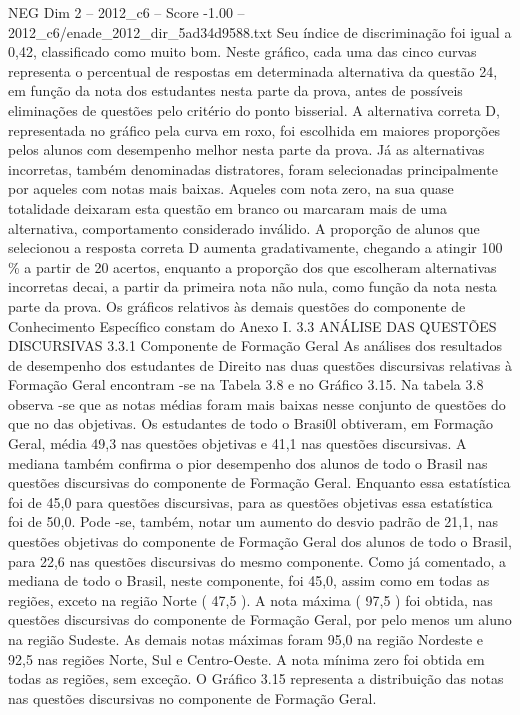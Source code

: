 \begin{textsample}{NEG Dim 2 – 2012\_c6 – Score -1.00 – 2012\_c6/enade\_2012\_dir\_5ad34d9588.txt}
Seu índice de discriminação foi igual a 0,42, classificado como muito bom.
Neste gráfico, cada uma das cinco curvas representa o percentual de respostas em determinada alternativa da questão 24, em função da nota dos estudantes nesta parte da prova, antes de possíveis eliminações de questões pelo critério do ponto bisserial.
A alternativa correta D, representada no gráfico pela curva em roxo, foi escolhida em maiores proporções pelos alunos com desempenho melhor nesta parte da prova.
Já as alternativas incorretas, também denominadas distratores, foram selecionadas principalmente por aqueles com notas mais baixas.
Aqueles com nota zero, na sua quase totalidade deixaram esta questão em branco ou marcaram mais de uma alternativa, comportamento considerado inválido.
A proporção de alunos que selecionou a resposta correta D aumenta gradativamente, chegando a atingir 100 \% a partir de 20 acertos, enquanto a proporção dos que escolheram alternativas incorretas decai, a partir da primeira nota não nula, como função da nota nesta parte da prova.
Os gráficos relativos às demais questões do componente de Conhecimento Específico constam do Anexo I. 3.3 ANÁLISE DAS QUESTÕES DISCURSIVAS 3.3.1 Componente de Formação Geral As análises dos resultados de desempenho dos estudantes de Direito nas duas questões discursivas relativas à Formação Geral encontram -se na Tabela 3.8 e no Gráfico 3.15.
Na tabela 3.8 observa -se que as notas médias foram mais baixas nesse conjunto de questões do que no das objetivas.
Os estudantes de todo o Brasi0l obtiveram, em Formação Geral, média 49,3 nas questões objetivas e 41,1 nas questões discursivas.
A mediana também confirma o pior desempenho dos alunos de todo o Brasil nas questões discursivas do componente de Formação Geral.
Enquanto essa estatística foi de 45,0 para questões discursivas, para as questões objetivas essa estatística foi de 50,0.
Pode -se, também, notar um aumento do desvio padrão de 21,1, nas questões objetivas do componente de Formação Geral dos alunos de todo o Brasil, para 22,6 nas questões discursivas do mesmo componente.
Como já comentado, a mediana de todo o Brasil, neste componente, foi 45,0, assim como em todas as regiões, exceto na região Norte ( 47,5 ).
A nota máxima ( 97,5 ) foi obtida, nas questões discursivas do componente de Formação Geral, por pelo menos um aluno na região Sudeste.
As demais notas máximas foram 95,0 na região Nordeste e 92,5 nas regiões Norte, Sul e Centro-Oeste.
A nota mínima zero foi obtida em todas as regiões, sem exceção.
O Gráfico 3.15 representa a distribuição das notas nas questões discursivas no componente de Formação Geral.

\end{textsample}
